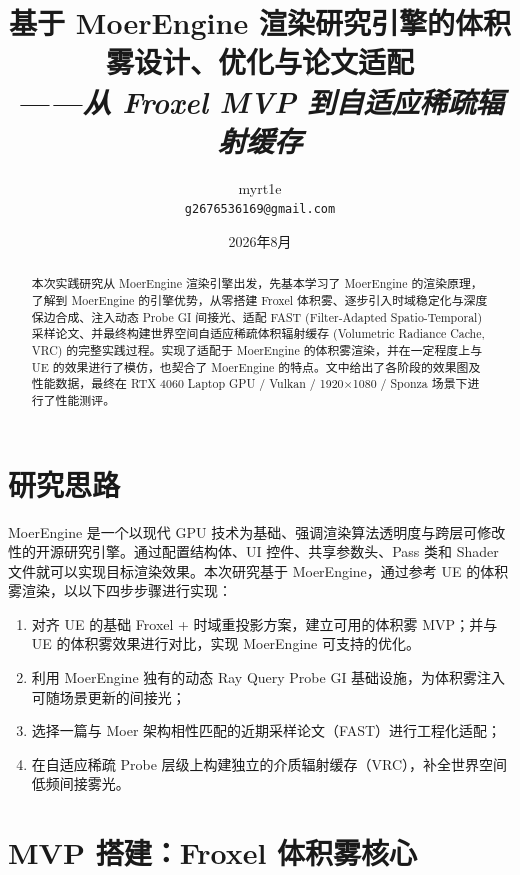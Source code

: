 \documentclass[11pt,a4paper]{article}
\title{
    \vspace{-1cm}
    {\Large 基于 MoerEngine 渲染研究引擎的体积雾设计、优化与论文适配}\\[0.3cm]
    {\small \textit{——从 Froxel MVP 到自适应稀疏辐射缓存}}
}
\author{myrt1e \\ \texttt{g2676536169@gmail.com}}
\date{2026年8月}
\begin{document}
\maketitle
\thispagestyle{empty}

\begin{abstract}
本次实践研究从 MoerEngine 渲染引擎出发，先基本学习了 MoerEngine 的渲染原理，了解到 MoerEngine 的引擎优势，从零搭建 Froxel 体积雾、逐步引入时域稳定化与深度保边合成、注入动态 Probe GI 间接光、适配 FAST (Filter-Adapted Spatio-Temporal) 采样论文、并最终构建世界空间自适应稀疏体积辐射缓存 (Volumetric Radiance Cache, VRC) 的完整实践过程。实现了适配于 MoerEngine 的体积雾渲染，并在一定程度上与 UE 的效果进行了模仿，也契合了 MoerEngine 的特点。文中给出了各阶段的效果图及性能数据，最终在 RTX 4060 Laptop GPU / Vulkan / 1920$\times$1080 / Sponza 场景下进行了性能测评。
\end{abstract}

\tableofcontents
\newpage

\section{研究思路}

MoerEngine 是一个以现代 GPU 技术为基础、强调渲染算法透明度与跨层可修改性的开源研究引擎。通过配置结构体、UI 控件、共享参数头、Pass 类和 Shader 文件就可以实现目标渲染效果。本次研究基于 MoerEngine，通过参考 UE 的体积雾渲染，以以下四步步骤进行实现：

\begin{enumerate}[label=(\arabic*)]
    \item 对齐 UE 的基础 Froxel + 时域重投影方案，建立可用的体积雾 MVP；并与 UE 的体积雾效果进行对比，实现 MoerEngine 可支持的优化。
    \item 利用 MoerEngine 独有的动态 Ray Query Probe GI 基础设施，为体积雾注入可随场景更新的间接光；
    \item 选择一篇与 Moer 架构相性匹配的近期采样论文（FAST）进行工程化适配；
    \item 在自适应稀疏 Probe 层级上构建独立的介质辐射缓存（VRC），补全世界空间低频间接雾光。
\end{enumerate}

\section{MVP 搭建：Froxel 体积雾核心}
\end{document}
